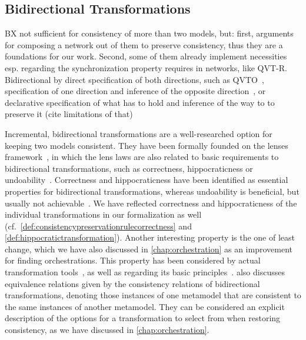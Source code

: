 \subsection{Bidirectional Transformations}

BX not sufficient for consistency of more than two models, but: first, arguments for composing a network out of them to preserve consistency, thus they are a foundations for our work. Second, some of them already implement necessities esp. regarding the synchronization property requires in networks, like QVT-R.
Bidirectional by direct specification of both directions, such as \gls{QVTO}~\cite{qvt}, specification of one direction and inference of the opposite direction~\cite{hettel2008synchronization-ICMT, semerath2016backwardTransformation-MODELS}, or declarative specification of what has to hold and inference of the way to to preserve it (cite limitations of that)

Incremental, bidirectional transformations are a well-researched option for keeping two models consistent.
They have been formally founded on the lenses framework~\cite{stevens2008bxalgebraic-ICGT}, in which the lens laws are also related to basic requirements to bidirectional transformations, such as correctness, hippocraticness or undoability~\cite{stevens2010sosym}.
Correctness and hippocraticness have been identified as essential properties for bidirectional transformations, whereas undoability is beneficial, but usually not achievable~\cite{stevens2010sosym}.
We have reflected correctness and hippocraticness of the individual transformations in our formalization as well (cf.\ \autoref{def:consistencypreservationrulecorrectness} and \autoref{def:hippocratictransformation}).
Another interesting property is the one of least change, which we have also discussed in \autoref{chap:orchestration} as an improvement for finding orchestrations.
This property has been considered by actual transformation tools~\cite{macedo2016qvtAtlAlloy-SoSym}, as well as regarding its basic principles~\cite{cheney2017LeastChangeBx-JOT}.
\textcite{stevens2012equivalences-EASST} also discusses equivalence relations given by the consistency relations of bidirectional transformations, denoting those instances of one metamodel that are consistent to the same instances of another metamodel.
They can be considered an explicit description of the options for a transformation to select from when restoring consistency, as we have discussed in \autoref{chap:orchestration}.

